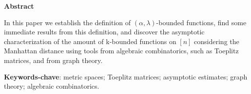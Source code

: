 \begin{center}
  \large \textbf{Abstract}
\end{center}
\vspace{1cm}
\par In this paper we establish the definition of $(\alpha, \lambda)$-bounded functions,
find some immediate results from this definition, and discover the asymptotic characterization of the amount of k-bounded functions on \([n]\) considering the Manhattan distance using tools from algebraic combinatorics, such as Toeplitz matrices, and from graph theory.

\vspace{1cm}

\begin{raggedleft}
  \textbf{Keywords-chave}: metric spaces; Toeplitz matrices; asymptotic estimates; graph theory; algebraic combinatorics.
\end{raggedleft}
